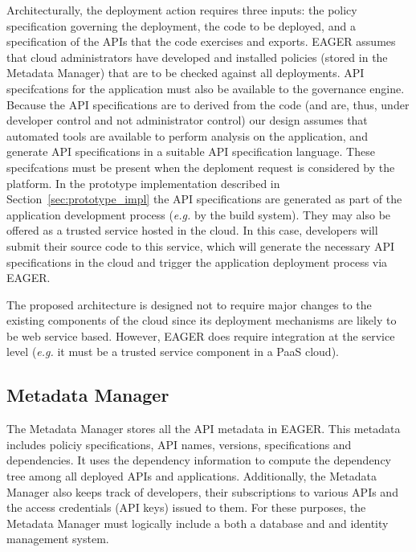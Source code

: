 Architecturally, the deployment action requires three inputs: the policy
specification governing the deployment, the code to be deployed, and a
specification of the APIs that the code exercises and exports.
EAGER assumes that cloud administrators have developed and installed policies
(stored in the Metadata Manager)
that are to be checked against all deployments.  API specifcations for the
application must also be available to the governance engine.  Because the API
specifications are to derived from the code (and are, thus, under developer
control and not administrator control) our design assumes that automated
tools are available
to perform analysis on the application, and
generate API specifications in a suitable API specification language. These
specifcations must be present
when the deploment request is considered by the platform.  In the prototype
implementation described in Section~\ref{sec:prototype_impl} the API specifications are
generated as part of the application development process ({\em e.g.} by the
build system).  They may also
be offered as a trusted service hosted in the cloud. 
In this case, developers will submit their source code
to this service, which will generate the necessary API specifications in the cloud and trigger
the application deployment process via EAGER.

The proposed architecture is designed not to require major changes to the 
existing components of the cloud since its deployment mechanisms are likely to
be web service based.  However, EAGER does require integration at the service level
({\em e.g.} it must be a trusted service component in a PaaS cloud). 

\subsection{Metadata Manager}
The Metadata Manager stores all the API metadata in EAGER. This metadata 
includes policiy specifications,  API names, versions, specifications and 
dependencies.
It uses the dependency information to compute the dependency tree 
among 
all deployed APIs and applications. Additionally, the Metadata Manager
also keeps track of developers, their subscriptions to various APIs and the access credentials (API keys) issued to them. 
For these purposes,
the Metadata Manager must logically include a both a database
and and identity management system.

